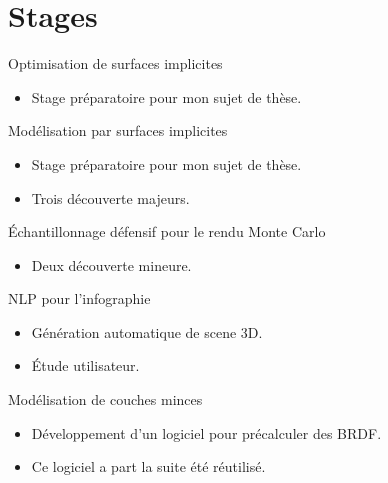 \documentclass[11pt,a4paper]{moderncv}
\begin{document}
\newpage
\section{Stages}


{\newline Optimisation de surfaces implicites}{\begin{itemize} \item Stage préparatoire pour mon sujet de thèse.\end{itemize}}

{\newline Modélisation par surfaces implicites}{\begin{itemize} \item Stage préparatoire pour mon sujet de thèse.\item Trois découverte majeurs.\end{itemize}}

{\newline Échantillonnage défensif pour le rendu Monte Carlo}{\begin{itemize} \item Deux découverte mineure.\end{itemize}}

{\newline NLP pour l'infographie}{\begin{itemize} \item Génération automatique de scene 3D.\item Étude utilisateur.\end{itemize}}

{\newline Modélisation de couches minces}{\begin{itemize} \item Développement d'un logiciel pour précalculer des BRDF.\item Ce logiciel a part la suite été réutilisé.\end{itemize}}

\end{document}
